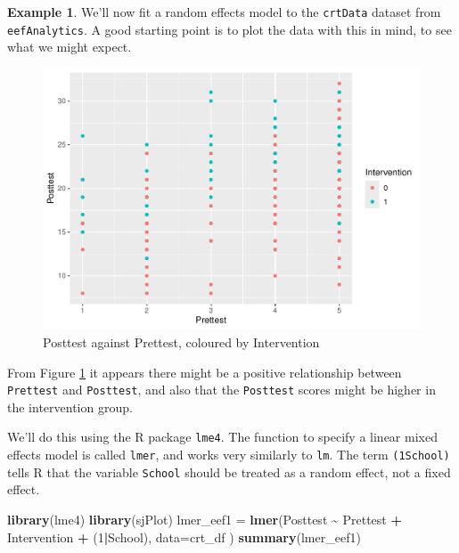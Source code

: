 \documentclass[
  openany]{book}
\newenvironment{Shaded}{\begin{snugshade}}{\end{snugshade}}
\newcommand{\AttributeTok}[1]{\textcolor[rgb]{0.13,0.29,0.53}{#1}}
\newcommand{\DecValTok}[1]{\textcolor[rgb]{0.00,0.00,0.81}{#1}}
\newcommand{\FunctionTok}[1]{\textcolor[rgb]{0.13,0.29,0.53}{\textbf{#1}}}
\newcommand{\NormalTok}[1]{#1}
\newcommand{\OtherTok}[1]{\textcolor[rgb]{0.56,0.35,0.01}{#1}}
\newcommand{\SpecialCharTok}[1]{\textcolor[rgb]{0.81,0.36,0.00}{\textbf{#1}}}
\theoremstyle{definition}
\theoremstyle{definition}
\newtheorem{example}{Example}[chapter]
\theoremstyle{definition}
\theoremstyle{definition}
\theoremstyle{remark}
\begin{document}
\begin{example}
We'll now fit a random effects model to the \texttt{crtData} dataset from \texttt{eefAnalytics}. A good starting point is to plot the data with this in mind, to see what we might expect.

\begin{figure}
\centering
\includegraphics{CT4H_notes_files/figure-latex/eefplot2-1.pdf}
\caption{\label{fig:eefplot2}Posttest against Prettest, coloured by Intervention}
\end{figure}

From Figure \ref{fig:eefplot2} it appears there might be a positive relationship between \texttt{Prettest} and \texttt{Posttest}, and also that the \texttt{Posttest} scores might be higher in the intervention group.

We'll do this using the R package \texttt{lme4}. The function to specify a linear mixed effects model is called \texttt{lmer}, and works very similarly to \texttt{lm}. The term \texttt{(1\textbar{}School)} tells R that the variable \texttt{School} should be treated as a random effect, not a fixed effect.

\begin{Shaded}
\begin{Highlighting}[]
\FunctionTok{library}\NormalTok{(lme4) }
\FunctionTok{library}\NormalTok{(sjPlot)}
\NormalTok{lmer\_eef1 }\OtherTok{=} \FunctionTok{lmer}\NormalTok{(Posttest }\SpecialCharTok{\textasciitilde{}}\NormalTok{ Prettest }\SpecialCharTok{+}\NormalTok{ Intervention }\SpecialCharTok{+}\NormalTok{ (}\DecValTok{1}\SpecialCharTok{|}\NormalTok{School), }\AttributeTok{data=}\NormalTok{crt\_df )}
\FunctionTok{summary}\NormalTok{(lmer\_eef1)}
\end{Highlighting}
\end{Shaded}


\end{example}
\end{document}
